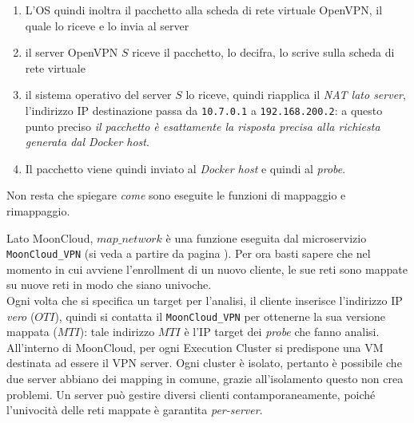 \begin{enumerate}
  \item  L'OS quindi inoltra il pacchetto alla scheda di rete virtuale
  OpenVPN, il quale lo riceve e lo invia al server
  \item il server OpenVPN $S$ riceve il pacchetto, lo decifra, lo scrive sulla scheda di rete
  virtuale
  \item il sistema operativo del server $S$ lo riceve, quindi riapplica
  il \textit{NAT lato server}, l'indirizzo IP destinazione passa da \texttt{10.7.0.1}
  a \texttt{192.168.200.2}: a questo punto preciso \textit{il pacchetto è esattamente
  la risposta precisa alla richiesta generata dal Docker host}.
  \item Il pacchetto viene quindi inviato al \textit{Docker host} e quindi al \textit{probe}.
\end{enumerate}
Non resta che spiegare \textit{come} sono eseguite le funzioni di mappaggio
e rimappaggio.


Lato MoonCloud, $map\_network$ è una funzione eseguita dal microservizio
\texttt{MoonCloud\_VPN} (si veda a partire da pagina \pageref{ch:microservice}).
Per ora basti sapere che nel momento
in cui avviene l'enrollment di un nuovo cliente, le sue reti sono mappate
su nuove reti in modo che siano univoche.\\
Ogni volta che si specifica un target per l'analisi, il cliente inserisce l'indirizzo IP
\textit{vero} ($OTI$), quindi si contatta il \texttt{MoonCloud\_VPN} per ottenerne
la sua versione mappata ($MTI$): tale indirizzo $MTI$ è l'IP target dei \textit{probe}
che fanno analisi.\\
All'interno di MoonCloud, per ogni Execution Cluster si predispone una VM destinata ad
essere il VPN server. Ogni cluster è isolato, pertanto è possibile che due server abbiano
dei mapping in comune, grazie all'isolamento questo non crea problemi.
Un server può gestire diversi clienti
contamporaneamente, poiché l'univocità delle reti mappate è garantita \textit{per-server}.


